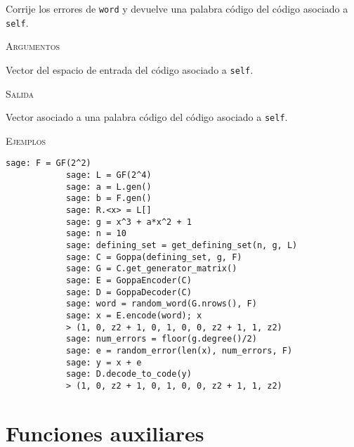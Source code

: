 \begin{description}[leftmargin=1em, font=\normalfont\ttfamily, style=nextline]
\begin{description}[font=\ttfamily, style=nextline]
        \item[decote\_to\_code(self, word)] Corrije los errores de \texttt{word} y devuelve una palabra código del código asociado a \texttt{self}.
         
        \textsc{Argumentos}
        \begin{description}[font=\normalfont\ttfamily]
            \item[word] Vector del espacio de entrada del código asociado a \texttt{self}.
        \end{description}

        \textsc{Salida}
        \begin{description}[font=\normalfont\ttfamily]
            \item[] Vector asociado a una palabra código del código asociado a \texttt{self}.
        \end{description}

        \textsc{Ejemplos}
        \begin{lstlisting}[gobble=4]
            sage: F = GF(2^2)
            sage: L = GF(2^4)
            sage: a = L.gen()
            sage: b = F.gen()
            sage: R.<x> = L[]
            sage: g = x^3 + a*x^2 + 1
            sage: n = 10
            sage: defining_set = get_defining_set(n, g, L)
            sage: C = Goppa(defining_set, g, F)
            sage: G = C.get_generator_matrix()
            sage: E = GoppaEncoder(C)
            sage: D = GoppaDecoder(C)
            sage: word = random_word(G.nrows(), F)
            sage: x = E.encode(word); x
            > (1, 0, z2 + 1, 0, 1, 0, 0, z2 + 1, 1, z2)
            sage: num_errors = floor(g.degree()/2)
            sage: e = random_error(len(x), num_errors, F)
            sage: y = x + e
            sage: D.decode_to_code(y)
            > (1, 0, z2 + 1, 0, 1, 0, 0, z2 + 1, 1, z2)
        \end{lstlisting}
    \end{description}
\end{description}

\section{Funciones auxiliares}

